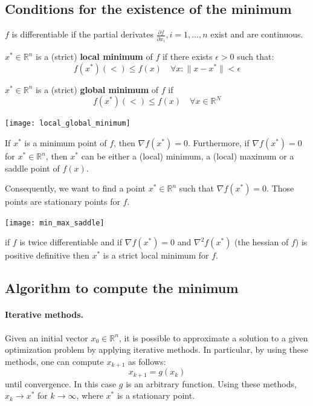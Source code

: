 \documentclass{article}
\begin{document}
\subsection{Conditions for the existence of the minimum} 
\begin{definition}
    $f$ is differentiable if the partial derivates
    $\frac{\partial{f}}{\partial{x_i}},i=1,\ldots,n$ exist and are continuous. 
\end{definition}
\begin{definition}
    $x^*\in \mathbb{R}^n$ is a (strict) \textbf{local minimum} of $f$ if there
    exists $\epsilon>0$ such that:
    $$f(x^*)(<)\leq f(x)\quad \forall x: \lVert x-x^*\rVert<\epsilon$$
\end{definition}
\begin{definition}
    $x^*\in \mathbb{R}^n$ is a (strict) \textbf{global minimum} of $f$ if 
    $$f(x^*)(<)\leq f(x)\quad \forall x\in\mathbb{R}^N$$
\end{definition}
\begin{center}
    \texttt{[image: local\_global\_minimum]}
\end{center}
\begin{definition}
    If $x^*$ is a minimum point of $f$, then $\nabla f(x^*)=0$. Furthermore,
    if $\nabla f(x^*)=0$ for $x^*\in \mathbb{R}^n$, then $x^*$ can be either a
    (local) minimum, a (local) maximum or a saddle point of $f(x)$.
\end{definition}
Consequently, we want to find a point $x^*\in \mathbb{R}^n$ such that $\nabla
f(x^*)=0$. Those points are stationary points for $f$.
\begin{center}
    \texttt{[image: min\_max\_saddle]}
\end{center}
\begin{definition}
    if $f$ is twice differentiable and if $\nabla f(x^*)=0$ and
    $\nabla^2f(x^*)$ (the hessian of $f$) is positive definitive then $x^*$ is
    a strict local minimum for $f$.
\end{definition}
\subsection{Algorithm to compute the minimum}

\paragraph{Iterative methods.} Given an initial vector $x_0\in \mathbb{R}^n$,
it is possible to approximate a solution to a given optimization problem by
applying iterative methods. In particular, by using these methods, one can
compute $x_{k+1}$ as follows:
$$x_{k+1}=g(x_k)$$
until convergence. In this case $g$ is an arbitrary function. Using these
methods, $x_k\to x^*$ for $k\to\infty$, where $x^*$ is a stationary point.
\end{document}
